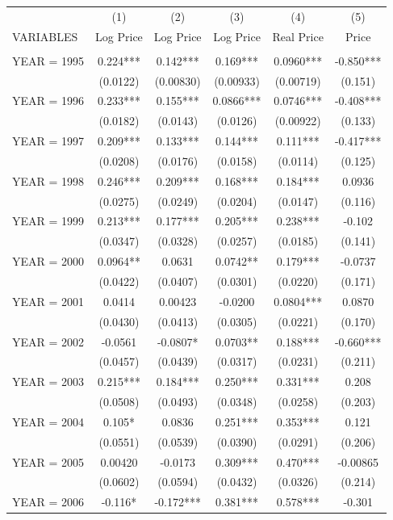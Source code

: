 \begin{tabular}{lccccc} \hline
 & (1) & (2) & (3) & (4) & (5) \\
VARIABLES & Log Price & Log Price & Log Price & Real Price & Price \\ \hline
 &  &  &  &  &  \\
YEAR = 1995 & 0.224*** & 0.142*** & 0.169*** & 0.0960*** & -0.850*** \\
 & (0.0122) & (0.00830) & (0.00933) & (0.00719) & (0.151) \\
YEAR = 1996 & 0.233*** & 0.155*** & 0.0866*** & 0.0746*** & -0.408*** \\
 & (0.0182) & (0.0143) & (0.0126) & (0.00922) & (0.133) \\
YEAR = 1997 & 0.209*** & 0.133*** & 0.144*** & 0.111*** & -0.417*** \\
 & (0.0208) & (0.0176) & (0.0158) & (0.0114) & (0.125) \\
YEAR = 1998 & 0.246*** & 0.209*** & 0.168*** & 0.184*** & 0.0936 \\
 & (0.0275) & (0.0249) & (0.0204) & (0.0147) & (0.116) \\
YEAR = 1999 & 0.213*** & 0.177*** & 0.205*** & 0.238*** & -0.102 \\
 & (0.0347) & (0.0328) & (0.0257) & (0.0185) & (0.141) \\
YEAR = 2000 & 0.0964** & 0.0631 & 0.0742** & 0.179*** & -0.0737 \\
 & (0.0422) & (0.0407) & (0.0301) & (0.0220) & (0.171) \\
YEAR = 2001 & 0.0414 & 0.00423 & -0.0200 & 0.0804*** & 0.0870 \\
 & (0.0430) & (0.0413) & (0.0305) & (0.0221) & (0.170) \\
YEAR = 2002 & -0.0561 & -0.0807* & 0.0703** & 0.188*** & -0.660*** \\
 & (0.0457) & (0.0439) & (0.0317) & (0.0231) & (0.211) \\
YEAR = 2003 & 0.215*** & 0.184*** & 0.250*** & 0.331*** & 0.208 \\
 & (0.0508) & (0.0493) & (0.0348) & (0.0258) & (0.203) \\
YEAR = 2004 & 0.105* & 0.0836 & 0.251*** & 0.353*** & 0.121 \\
 & (0.0551) & (0.0539) & (0.0390) & (0.0291) & (0.206) \\
YEAR = 2005 & 0.00420 & -0.0173 & 0.309*** & 0.470*** & -0.00865 \\
 & (0.0602) & (0.0594) & (0.0432) & (0.0326) & (0.214) \\
YEAR = 2006 & -0.116* & -0.172*** & 0.381*** & 0.578*** & -0.301 \\

\end{tabular}
